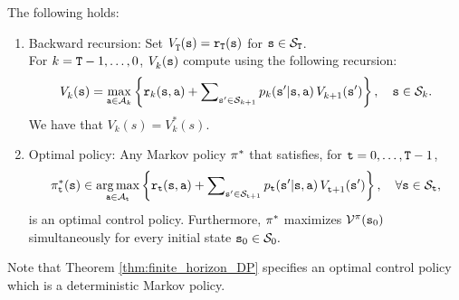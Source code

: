 \begin{theorem}\label{thm:finite_horizon_DP}
The following holds:
\begin{enumerate}
\item
Backward recursion:  Set $V_{\tt T}^{}({\tt s}) = {{\tt r}_{\tt T}}({\tt s})$ for ${\tt s}\in {\mathcal{S}_{\tt T}}$.\\
     For $k = {\tt T} -1, \ldots ,0$, $V_k^{}({\tt s})$  compute using the following recursion:
\[V_k^{}({\tt s}) = \mathop {\max }\limits_{{\tt a} \in {\mathcal{A}_k}} \left\{ {{{\tt r}_k}({\tt s},{\tt a}) + \sum\nolimits_{{\tt s}' \in {\mathcal{S}_{k + 1}}} {{p_k}({\tt s}'|{\tt s},{\tt a})\,} V_{k + 1}^{}({\tt s}')} \right\},  \quad  {\tt s} \in {\mathcal{S}_k}.\]
We have that $V_k(s)=V^*_k(s)$.
\item
Optimal policy: Any Markov policy ${\pi ^*}$ that satisfies, for ${\tt t} = 0, \ldots ,{\tt T} -1$,
\[\pi _{\tt t}^*({\tt s}) \in \mathop {\arg \max }\limits_{{\tt a} \in {\mathcal{A}_{\tt t}}} \left\{ {{{\tt r}_{\tt t}}({\tt s},{\tt a}) + \sum\nolimits_{{\tt s}' \in {\mathcal{S}_{{\tt t}+ 1}}} {{p_{\tt t}}({\tt s}'|{\tt s},{\tt a})\,} V_{{\tt t} + 1}^{}({\tt s}')} \right\},\quad \forall {\tt s} \in {\mathcal{S}_{\tt t}},\]
is an optimal control policy. Furthermore, ${\pi ^*}$ maximizes
${\mathcal{V}^\pi }({{\tt s}_0})$ simultaneously for every initial state
${{\tt s}_0} \in {\mathcal{S}_0}.$
\end{enumerate}
\end{theorem}
Note that Theorem \ref{thm:finite_horizon_DP} specifies an optimal control policy which is a deterministic Markov policy.

